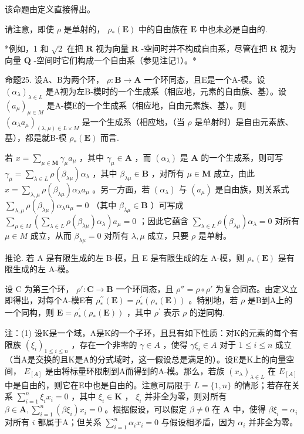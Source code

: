 该命题由定义直接得出。

请注意，即使 \(\rho\) 是单射的， \(\rho_{*}(\mathbf{E})\) 中的自由族在 \(\mathbf{E}\) 中也未必是自由的.

*例如，1 和 \(\sqrt{2}\) 在把 \(\mathbf{R}\) 视为向量 \(\mathbf{R}\) -空间时并不构成自由系，尽管在把 \(\mathbf{R}\) 视为向量 \(\mathbf{Q}\) -空间时它们构成一个自由系（参见注记1）。*

命题25. 设A、B为两个环， \(\rho: \mathbf{B} \to \mathbf{A}\) 一个环同态，且E是一个A-模。设 \((\alpha_{\lambda})_{\lambda \in L}\) 是A视为左B-模时的一个生成系（相应地，元素的自由族、基）。设 \((a_{\mu})_{\mu \in M}\) 是A-模E的一个生成系（相应地，自由元素族、基）。则 \((\alpha_{\lambda}a_{\mu})_{(\lambda,\mu) \in L \times M}\) 是一个生成系（相应地，（当 \(\rho\) 是单射时）是自由元素族、基），都是就B-模 \(\rho_{*}(\mathbf{E})\) 而言.

若 \(x = \sum_{\mu \in \mathbf{M}} \gamma_{\mu} a_{\mu}\) ，其中 \(\gamma_{\mu} \in \mathbf{A}\) ，而 \((\alpha_{\lambda})\) 是 \(\mathbf{A}\) 的一个生成系，则可写 \(\gamma_{\mu} = \sum_{\lambda \in L} \rho(\beta_{\lambda \mu}) \alpha_{\lambda}\) ，其中 \(\beta_{\lambda \mu} \in \mathbf{B}\) ，对所有 \(\mu \in \mathbf{M}\) 成立，由此 \(x = \sum_{\lambda, \mu} \rho(\beta_{\lambda \mu}) \alpha_{\lambda} a_{\mu}\) 。另一方面，若 \((\alpha_{\lambda})\) 与 \((a_{\mu})\) 是自由族，则关系式 \(\sum_{\lambda, \mu} \rho(\beta_{\lambda \mu}) \alpha_{\lambda} a_{\mu} = 0\) （其中 \(\beta_{\lambda \mu} \in \mathbf{B}\) ）可写成 \(\sum_{\mu \in M} \left( \sum_{\lambda \in L} \rho(\beta_{\lambda \mu}) \alpha_{\lambda} \right) a_{\mu} = 0\) ；因此它蕴含 \(\sum_{\lambda \in L} \rho(\beta_{\lambda \mu}) \alpha_{\lambda} = 0\) 对所有 \(\mu \in M\) 成立，从而 \(\beta_{\lambda \mu} = 0\) 对所有 \(\lambda, \mu\) 成立，只要 \(\rho\) 是单射。

推论. 若 A 是有限生成的左 B-模，且 E 是有限生成的左 A-模，则 \(\rho_{*}(\mathbf{E})\) 是有限生成的左 A-模。

设 C 为第三个环， \(\rho':\mathbf{C}\to\mathbf{B}\) 一个环同态，且 \(\rho''=\rho\circ\rho'\) 为复合同态。由定义立即得出，对每个A-模E有 \(\rho_{*}^{\prime \prime}(\mathbf{E}) = \rho_{*}^{\prime}(\rho_{*}(\mathbf{E}))\) 。特别地，若 \(\rho\) 是B到A上的一个同构，则 \(\mathbf{E} = \rho_{*}^{\prime}(\rho_{*}(\mathbf{E}))\) ，其中 \(\rho^{\prime}\) 表示 \(\rho\) 的逆同构.

注：(1) 设K是一个域，A是K的一个子环，且具有如下性质：对K的元素的每个有限族 \((\xi_{i})_{1\leqslant i\leqslant n}\) ，存在一个非零的 \(\gamma\in A\) ，使得 \(\gamma\xi_{i}\in A\) 对于 \(1\leqslant i\leqslant n\) 成立（当A是交换的且K是A的分式域时，这一假设总是满足的）。设E是K上的向量空间， \(E_{[A]}\) 是由将标量环限制到A而得到的A-模。那么，若族 \((x_{\lambda})_{\lambda\in L}\) 在 \(E_{[A]}\) 中是自由的，则它在E中也是自由的。注意可局限于 \(L=\{1,n\}\) 的情形；若存在关系 \(\sum_{i=1}^{n} \xi_i x_i = 0\) ，其中 \(\xi_i \in \mathbf{K}\) ， \(\xi_i\) 并非全为零，则对所有 \(\beta \in \mathbf{A}, \sum_{i=1}^{n} (\beta \xi_i) x_i = 0\) 。根据假设，可以假定 \(\beta \neq 0\) 在 \(\mathbf{A}\) 中，使得 \(\beta \xi_{i} = \alpha_{i}\) 对所有 \(i\) 都属于A；但关系 \(\sum_{i=1}^{n} \alpha_{i} x_{i} = 0\) 与假设相矛盾，因为 \(\alpha_{i}\) 并非全为零。

